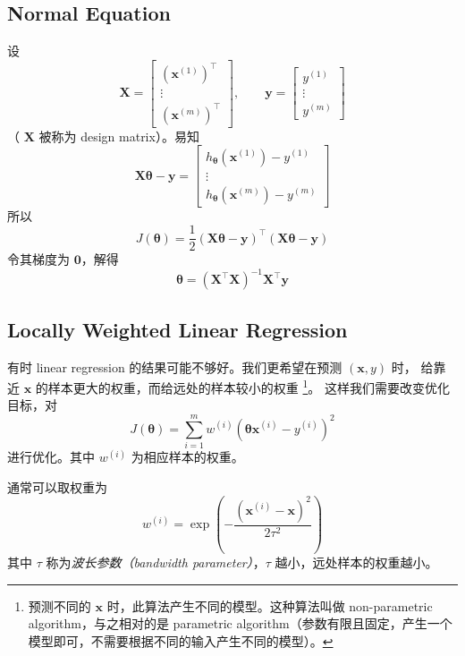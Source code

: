 	\subsection{Normal Equation}
		设
		\begin{equation*}
			\bm{X} = 
			\begin{bmatrix}
				(\bm{x}^{(1)})^\intercal \\
				\vdots \\
				(\bm{x}^{(m)})^\intercal
			\end{bmatrix}
			, \qquad \bm{y} = 
			\begin{bmatrix}
				y^{(1)} \\
				\vdots \\
				y^{(m)}
			\end{bmatrix}
		\end{equation*}
		（ $ \bm{X} $ 被称为 design matrix）。易知 
		\begin{equation}
			\bm{X} \bm{\theta} - \bm{y} = 
			\begin{bmatrix}
				h_{\bm{\theta}} (\bm{x}^{(1)}) - y^{(1)} \\
				\vdots \\
				h_{\bm{\theta}} (\bm{x}^{(m)}) - y^{(m)} 
			\end{bmatrix}
		\end{equation}
		所以 
		\begin{equation}
			J(\bm{\theta}) = \frac{1}{2} \left( \bm{X} \bm{\theta} - \bm{y} \right)^\intercal \left( \bm{X}\bm{\theta} - \bm{y} \right)
		\end{equation}
		令其梯度为 $ \bm{0} $，解得 
		\begin{equation}
			\bm{\theta} = \left( \bm{X}^\intercal \bm{X} \right) ^{-1} \bm{X}^\intercal \bm{y}
		\end{equation}
		
	\subsection{Locally Weighted Linear Regression}
		有时 linear regression 的结果可能不够好。我们更希望在预测 $ (\bm{x}, y) $ 时，
		给靠近 $ \bm{x} $ 的样本更大的权重，而给远处的样本较小的权重
		\footnote{预测不同的 $ \bm{x} $ 时，此算法产生不同的模型。这种算法叫做 non-parametric algorithm，与之相对的是 parametric algorithm（参数有限且固定，产生一个模型即可，不需要根据不同的输入产生不同的模型）。}。
		这样我们需要改变优化目标，对 
		\begin{equation}
			J(\bm{\theta}) = \sum_{i=1}^{m} w^{(i)} (\bm{\theta}\bm{x}^{(i)} - y^{(i)})^2
		\end{equation}
		进行优化。其中 $ w^{(i)} $ 为相应样本的权重。
		
		通常可以取权重为
		\begin{equation}
			w^{(i)} = \exp \left( - \frac{ (\bm{x}^{(i)} - \bm{x})^2 }{2\tau ^2} \right)
		\end{equation}
		其中 $ \tau $ 称为\emph{波长参数（bandwidth parameter）}，$ \tau $ 越小，远处样本的权重越小。